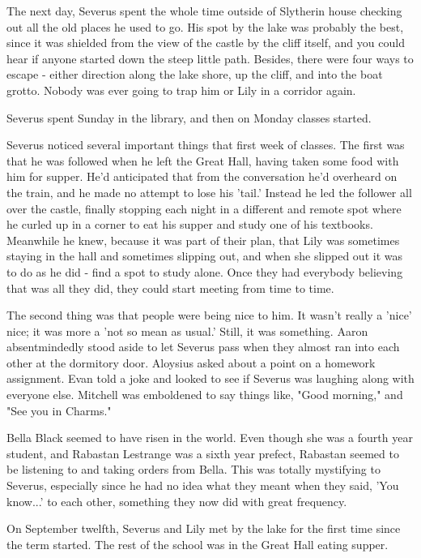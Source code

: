 \documentclass[a4paper,11pt]{article}
\begin{document}
The next day, Severus spent the whole time outside of Slytherin house checking out all the old places he used to go. His spot by the lake was probably the best, since it was shielded from the view of the castle by the cliff itself, and you could hear if anyone started down the steep little path. Besides, there were four ways to escape - either direction along the lake shore, up the cliff, and into the boat grotto. Nobody was ever going to trap him or Lily in a corridor again.

Severus spent Sunday in the library, and then on Monday classes started.

Severus noticed several important things that first week of classes. The first was that he was followed when he left the Great Hall, having taken some food with him for supper. He'd anticipated that from the conversation he'd overheard on the train, and he made no attempt to lose his 'tail.' Instead he led the follower all over the castle, finally stopping each night in a different and remote spot where he curled up in a corner to eat his supper and study one of his textbooks. Meanwhile he knew, because it was part of their plan, that Lily was sometimes staying in the hall and sometimes slipping out, and when she slipped out it was to do as he did - find a spot to study alone. Once they had everybody believing that was all they did, they could start meeting from time to time.

The second thing was that people were being nice to him. It wasn't really a 'nice' nice; it was more a 'not so mean as usual.' Still, it was something. Aaron absentmindedly stood aside to let Severus pass when they almost ran into each other at the dormitory door. Aloysius asked about a point on a homework assignment. Evan told a joke and looked to see if Severus was laughing along with everyone else. Mitchell was emboldened to say things like, "Good morning," and "See you in Charms."

Bella Black seemed to have risen in the world. Even though she was a fourth year student, and Rabastan Lestrange was a sixth year prefect, Rabastan seemed to be listening to and taking orders from Bella. This was totally mystifying to Severus, especially since he had no idea what they meant when they said, 'You know...' to each other, something they now did with great frequency.

On September twelfth, Severus and Lily met by the lake for the first time since the term started. The rest of the school was in the Great Hall eating supper.
\end{document}
